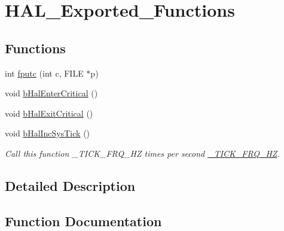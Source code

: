 \hypertarget{group___h_a_l___exported___functions}{}\section{H\+A\+L\+\_\+\+Exported\+\_\+\+Functions}
\label{group___h_a_l___exported___functions}
\subsection*{Functions}
\begin{DoxyCompactItemize}
\item 
int \mbox{\hyperlink{group___h_a_l___exported___functions_gaf709c07e26adbffa5d9984b2cec63c69}{fputc}} (int c, F\+I\+LE $\ast$p)
\item 
void \mbox{\hyperlink{group___h_a_l___exported___functions_gac4b3d313f1c9c001234743725e491b9a}{b\+Hal\+Enter\+Critical}} ()
\item 
void \mbox{\hyperlink{group___h_a_l___exported___functions_ga9b005cf96b043e836780e1cc1b9254fc}{b\+Hal\+Exit\+Critical}} ()
\item 
void \mbox{\hyperlink{group___h_a_l___exported___functions_ga1e845f28a0763b4046d1c7cdcf227e52}{b\+Hal\+Inc\+Sys\+Tick}} ()
\begin{DoxyCompactList}\small\item\em Call this function \+\_\+\+T\+I\+C\+K\+\_\+\+F\+R\+Q\+\_\+\+HZ times per second \mbox{\hyperlink{b__config_8h_ae2076738df8e2eff78366a0187291367}{\+\_\+\+T\+I\+C\+K\+\_\+\+F\+R\+Q\+\_\+\+HZ}}. \end{DoxyCompactList}\end{DoxyCompactItemize}


\subsection{Detailed Description}


\subsection{Function Documentation}
\mbox{\label{group___h_a_l___exported___functions_gac4b3d313f1c9c001234743725e491b9a}} 
